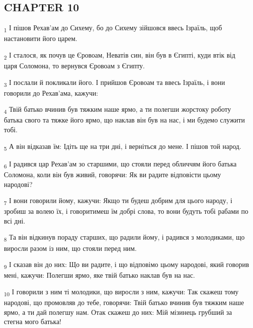 \subsection{CHAPTER 10}
\begin{tcolorbox}
\textsubscript{1} І пішов Рехав'ам до Сихему, бо до Сихему зійшовся ввесь Ізраїль, щоб настановити його царем.
\end{tcolorbox}
\begin{tcolorbox}
\textsubscript{2} І сталося, як почув це Єровоам, Неватів син, він був в Єгипті, куди втік від царя Соломона, то вернувся Єровоам з Єгипту.
\end{tcolorbox}
\begin{tcolorbox}
\textsubscript{3} І послали й покликали його. І прийшов Єровоам та ввесь Ізраїль, і вони говорили до Рехав'ама, кажучи:
\end{tcolorbox}
\begin{tcolorbox}
\textsubscript{4} Твій батько вчинив був тяжким наше ярмо, а ти полегши жорстоку роботу батька свого та тяжке його ярмо, що наклав він був на нас, і ми будемо служити тобі.
\end{tcolorbox}
\begin{tcolorbox}
\textsubscript{5} А він відказав їм: Ідіть ще на три дні, і верніться до мене. І пішов той народ.
\end{tcolorbox}
\begin{tcolorbox}
\textsubscript{6} І радився цар Рехав'ам зо старшими, що стояли перед обличчям його батька Соломона, коли він був живий, говорячи: Як ви радите відповісти цьому народові?
\end{tcolorbox}
\begin{tcolorbox}
\textsubscript{7} І вони говорили йому, кажучи: Якщо ти будеш добрим для цього народу, і зробиш за волею їх, і говоритимеш їм добрі слова, то вони будуть тобі рабами по всі дні.
\end{tcolorbox}
\begin{tcolorbox}
\textsubscript{8} Та він відкинув пораду старших, що радили йому, і радився з молодиками, що виросли разом із ним, що стояли перед ним.
\end{tcolorbox}
\begin{tcolorbox}
\textsubscript{9} І сказав він до них: Що ви радите, і що відповімо цьому народові, який говорив мені, кажучи: Полегши ярмо, яке твій батько наклав був на нас.
\end{tcolorbox}
\begin{tcolorbox}
\textsubscript{10} І говорили з ним ті молодики, що виросли з ним, кажучи: Так скажеш тому народові, що промовляв до тебе, говорячи: Твій батько вчинив був тяжким наше ярмо, а ти дай полегшу нам. Отак скажеш до них: Мій мізинець грубший за стегна мого батька!
\end{tcolorbox}
